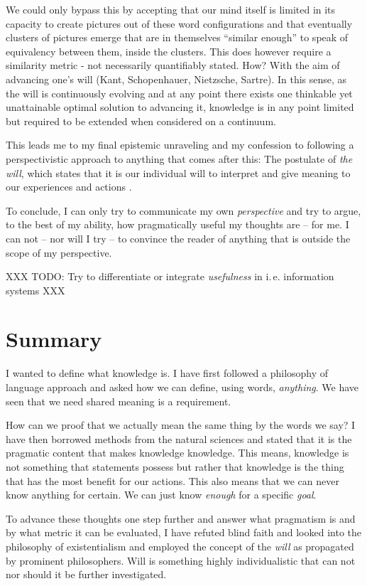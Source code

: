 We could only bypass this by accepting that our mind itself is limited in its capacity to create pictures out of these word configurations and that eventually clusters of pictures emerge that are in themselves \enquote{similar enough} to speak of equivalency between them, inside the clusters.
This does however require a similarity metric - not necessarily quantifiably stated.
How? With the aim of advancing one's will (Kant, Schopenhauer, Nietzsche, Sartre). In this sense, as the will is continuously evolving and at any point there exists one thinkable yet unattainable optimal solution to advancing it, knowledge is in any point limited but required to be extended when considered on a continuum.

This leads me to my final epistemic unraveling and my confession to following a perspectivistic approach to anything that comes after this:
The postulate of \textit{the will}, which states that it is our individual will to interpret and give meaning to our experiences and actions \parencite{schopenhauer-09}.

To conclude, I can only try to communicate my own \textit{perspective} and try to argue, to the best of my ability, how pragmatically useful my thoughts are -- for me.
I can not -- nor will I try -- to convince the reader of anything that is outside the scope of my perspective.

XXX TODO: Try to differentiate or integrate \textit{usefulness} in i.\,e. information systems XXX


\section{Summary}

I wanted to define what knowledge is.
I have first followed a philosophy of language approach and asked how we can define, using words, \textit{anything}.
We have seen that we need shared meaning is a requirement.

How can we proof that we actually mean the same thing by the words we say?
I have then borrowed methods from the natural sciences and stated that it is the pragmatic content that makes knowledge knowledge.
This means, knowledge is not something that statements possess but rather that knowledge is the thing that has the most benefit for our actions.
This also means that we can never know anything for certain.
We can just know \textit{enough} for a specific \textit{goal}.

To advance these thoughts one step further and answer what pragmatism is and by what metric it can be evaluated, I have refuted blind faith and looked into the philosophy of existentialism and employed the concept of the \textit{will} as propagated by prominent philosophers.
Will is something highly individualistic that can not nor should it be further investigated.

